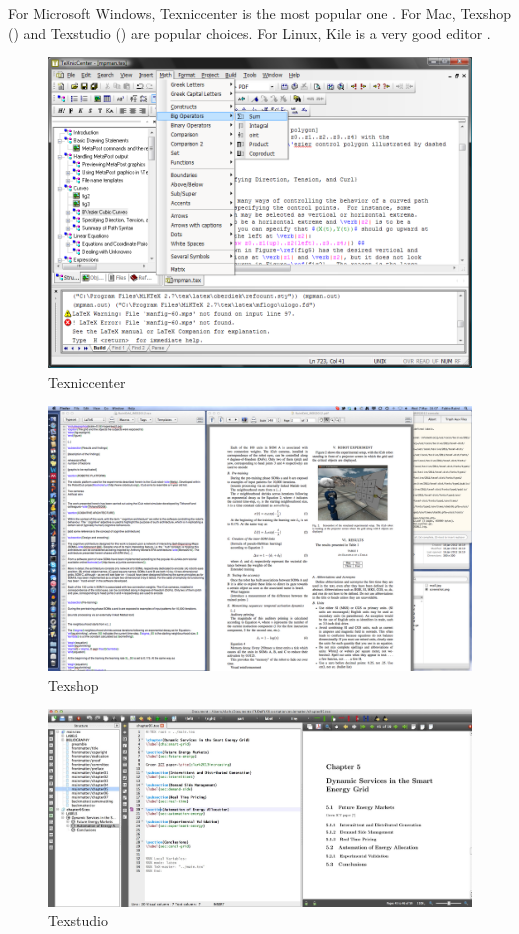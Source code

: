 For Microsoft Windows, Texniccenter is the most popular one .
For Mac, Texshop () and Texstudio () are popular choices.
For Linux, Kile is a very good \latex editor .

\begin{figure}
\includegraphics[width=\textwidth]{texniccenter.png}
\caption{Texniccenter}
\label{fig:latex:texniccenter} 
\end{figure}


\begin{figure}
\includegraphics[width=\textwidth]{texshop.png}
\caption{Texshop}
\label{fig:latex:texshop} 
\end{figure}

\begin{figure}
\includegraphics[width=\textwidth]{texstudio.jpg}
\caption{Texstudio}
\label{fig:latex:texstudio} 
\end{figure}


